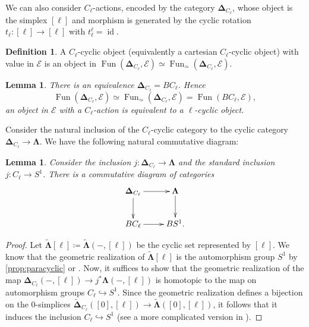 \documentclass[11pt]{amsart}
\numberwithin{equation}{section}
\theoremstyle{plain}
\newtheorem{Lemma}[lemma]{Lemma}
\theoremstyle{definition}
\newtheorem{Def}[def]{Definition}
\theoremstyle{remark}
\newcommand{\cE} { {\mathcal{E}}}
\newcommand{\id}{{\operatorname{id}}}
\newcommand\Fun{\operatorname{Fun}}
\begin{document}
We can also consider $C_\ell$-actions, encoded by the category $\boldsymbol{\Delta}_{C_\ell}$, whose object is the simplex $[\ell]$ and morphism is generated by the cyclic rotation $t_\ell: [\ell] \to [\ell]$ with $t_\ell^\ell = \id$.

\begin{Def}
    A $C_\ell$-cyclic object (equivalently a cartesian $C_\ell$-cyclic object) with value in $\cE$ is an object in $\Fun(\boldsymbol{\Delta}_{C_\ell}, \cE) \simeq \Fun_\simeq(\boldsymbol{\Delta}_{C_\ell}, \cE)$.
\end{Def}

\begin{Lemma}
    There is an equivalence $\boldsymbol{\Delta}_{C_\ell} = BC_\ell$. Hence
    \[\Fun(\boldsymbol{\Delta}_{C_\ell}, \cE) \simeq \Fun_\simeq(\boldsymbol{\Delta}_{C_\ell}, \cE) = \Fun(BC_\ell, \cE),\]
    an object in $\cE$ with a $C_\ell$-action is equivalent to a $\ell$-cyclic object.
\end{Lemma}

    Consider the natural inclusion of the $C_\ell$-cyclic category to the cyclic category $\boldsymbol{\Delta}_{C_\ell} \to \boldsymbol{\Lambda}$. We have the following natural commutative diagram:

\begin{Lemma}\label{lem:finite-action-1}
    Consider the inclusion $j: \boldsymbol{\Delta}_{C_\ell} \to \boldsymbol{\Lambda}$ and the standard inclusion $j: C_\ell \to S^1$. There is a commutative diagram of categories
    \[\xymatrix{
    \boldsymbol{\Delta}_{C_\ell} \ar[r] \ar[d] & \boldsymbol{\Lambda} \ar[d] \\
    BC_\ell \ar[r] & BS^1.
    }\]
\end{Lemma}
\begin{proof}
    Let $\widetilde{\boldsymbol{\Lambda}}[\ell] \coloneqq \widetilde{\boldsymbol{\Lambda}}(-, [\ell])$ be the cyclic set represented by $[\ell]$. We know that the geometric realization of $\widetilde{\boldsymbol{\Lambda}}[\ell]$ is the automorphism group $S^1$ by  \autoref{prop:paracyclic} or \cite[Exercise 7.2.1]{LodayCyclic}. Now, it suffices to show that the geometric realization of the map $\boldsymbol{\Delta}_{C_\ell}(-, [\ell]) \to j^*\boldsymbol{\Lambda}(-, [\ell])$ is homotopic to the map on automorphism groups $C_\ell \hookrightarrow S^1$. Since the geometric realization defines a bijection on the $0$-simplices $\widetilde{\boldsymbol{\Delta}}_{C_\ell}([0], [\ell]) \to \widetilde{\boldsymbol{\Lambda}}([0], [\ell])$, it follows that it induces the inclusion $C_\ell \hookrightarrow S^1$ (see a more complicated version in \cite[Lemma 5.1]{Chen1}).
\end{proof}
\end{document}
